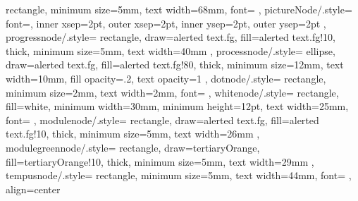 {{    rectangle,
    minimum size=5mm,
    text width=68mm,
    font=\tiny\normalfont
},
pictureNode/.style={
    font=\tiny\normalfont,
    inner xsep=2pt,
    outer xsep=2pt,
    inner ysep=2pt,
    outer ysep=2pt
},
progressnode/.style={
    rectangle,
    draw=alerted text.fg,
    fill=alerted text.fg!10,
    thick,
    minimum size=5mm,
    text width=40mm
},
processnode/.style={
    ellipse,
    draw=alerted text.fg,
    fill=alerted text.fg!80,
    thick,
    minimum size=12mm,
    text width=10mm,
    fill opacity=.2,
    text opacity=1
},
dotnode/.style={
    rectangle,
    minimum size=2mm,
    text width=2mm,
    font=\tiny\normalfont
},
whitenode/.style={
    rectangle,
    fill=white,
    minimum width=30mm,
    minimum height=12pt,
    text width=25mm,
    font=\normalfont
},
modulenode/.style={
    rectangle,
    draw=alerted text.fg,
    fill=alerted text.fg!10,
    thick,
    minimum size=5mm,
    text width=26mm
}, 
modulegreennode/.style={
    rectangle,
    draw=tertiaryOrange,
    fill=tertiaryOrange!10,
    thick,
    minimum size=5mm,
    text width=29mm
},
tempusnode/.style={
    rectangle,
    minimum size=5mm,
    text width=44mm,
    font=\tiny\normalfont
},
align=center
}

\newcommand{\nodeLabel}[2]{\node[labelnode] [above right=-0.15cm and -0.3cm of #1] {#2};}
\newcommand{\nodeLabelLeft}[2]{\node[labelnode] [above left=-0.05cm and -3.3cm of #1] {#2};}
\newcommand{\paperTitle}[2]{\node[papernode,align=left, anchor=north]  [right=0.25cm of #1] {\baselineskip=4.5pt#2\par};}


\newcommand{\drawArrowsMoralBankruptcy}[1]{
    \draw[-{Stealth[length=2mm, width=1.5mm]}, thick] 
        ([yshift=0cm, xshift=-0.2cm]#1.south east) -- ([yshift=0cm, xshift=0.5cm]#1.south west)
        node[midway, above, font=\small, fill=white, inner sep=1pt, minimum width=2.5cm, minimum height=0.5cm, yshift=-0.00cm] {moral hazard};
    
    \draw[-{Stealth[length=2mm, width=1.5mm]}, thick] 
        ([yshift=.5cm, xshift=-0.05cm]#1.south west) -- ([yshift=-.2cm, xshift=-.05cm]#1.north west)
        node[midway, right, font=\normalsize, fill=white, inner sep=1pt, xshift=0.4cm, yshift=-1.2cm, rotate=90, minimum width=2.5cm, minimum height=0.4cm] {bankruptcy cost};
}

